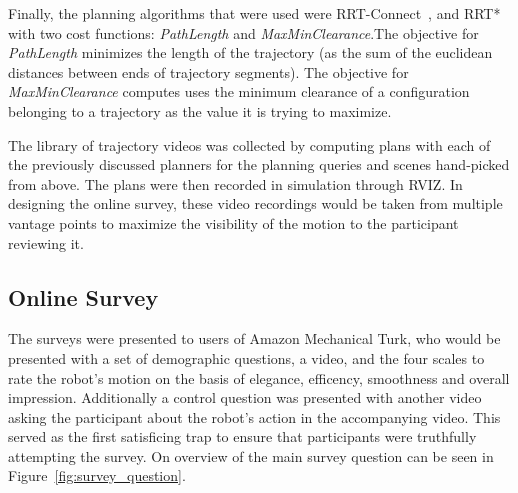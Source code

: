 \documentclass[letterpaper, 10 pt, conference]{ieeeconf}  %
\begin{document}
Finally, the planning algorithms that were used were RRT-Connect~\cite{kuffner2000rrt}, and RRT*~\cite{frazzoli-RRTstar} with two cost functions: \emph{PathLength} and \emph{MaxMinClearance}.The objective for \emph{PathLength} minimizes the length of the trajectory (as the sum of the euclidean distances between ends of trajectory segments). The objective for \emph{MaxMinClearance} computes uses the minimum clearance of a configuration belonging to a trajectory as the value it is trying to maximize.

The library of trajectory videos was collected by computing plans with each of the previously discussed planners for the planning queries and scenes hand-picked from above. The plans were then recorded in simulation through RVIZ. In designing the online survey, these video recordings would be taken from multiple vantage points to maximize the visibility of the motion to the participant reviewing it.

\subsection{Online Survey}

The surveys were presented to users of Amazon Mechanical Turk, who would be presented with a set of demographic questions, a video, and the four scales to rate the robot's motion on the basis of elegance, efficency, smoothness and overall impression. Additionally a control question was presented with another video asking the participant about the robot's action in the accompanying video. This served as the first satisficing trap to ensure that participants were truthfully attempting the survey. On overview of the main survey question can be seen in Figure~\ref{fig:survey_question}.
\end{document}
